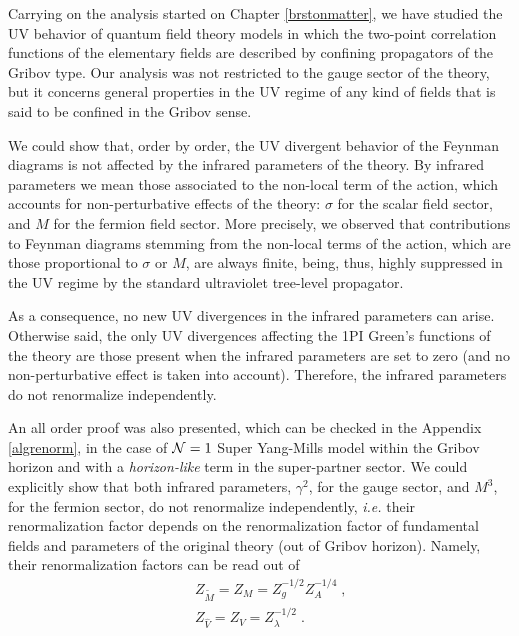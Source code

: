 Carrying on the analysis started on Chapter \ref{brstonmatter}, we have studied the UV
behavior of quantum field theory models in which the two-point correlation functions of the
elementary fields are described by confining propagators of the Gribov type. Our analysis was
not restricted to the gauge sector of the theory, but it concerns general properties in the UV
regime of any kind of fields that is said to be confined in the Gribov sense.


We could show that, order by order, the UV divergent behavior of the Feynman diagrams is not
affected by the infrared parameters of the theory. By infrared parameters we mean those
associated to the non-local term of the action, which accounts for non-perturbative
effects of the theory: $\sigma$ for the scalar field sector, and $M$ for the fermion field
sector. More precisely, we observed that contributions to Feynman diagrams stemming from the
non-local terms of the action, which are those proportional to $\sigma$ or $M$, are always
finite, being, thus, highly suppressed in the UV regime by the standard ultraviolet tree-level
propagator.

As a consequence, no new UV divergences in the infrared parameters can arise. Otherwise said,
the only UV divergences affecting the 1PI Green's functions of the theory are those present
when the infrared parameters are set to zero (and no non-perturbative effect is taken into
account). Therefore, the infrared parameters do not renormalize independently.

An all order proof was also presented, which can be checked in the Appendix \ref{algrenorm}, in the case of ${\cal N}=1$ Super Yang-Mills model within the Gribov horizon and with a \emph{horizon-like} term in the super-partner sector. We could explicitly show that both infrared parameters, $\gamma^{2}$, for the gauge sector, and $M^{3}$, for the fermion sector, do not renormalize independently, \emph{i.e.} their renormalization factor depends on the renormalization factor of fundamental fields and parameters of the original theory (out of Gribov horizon).  Namely, their renormalization factors can be read out of
\begin{eqnarray}
&&
Z_{\tilde{M}} =Z_{M} = Z^{-1/2}_{g}Z^{-1/4}_{A}\;, \nonumber \\
&&
Z_{\hat{V}} =Z_{V} = Z^{-1/2}_{\lambda}\;.
\end{eqnarray}























